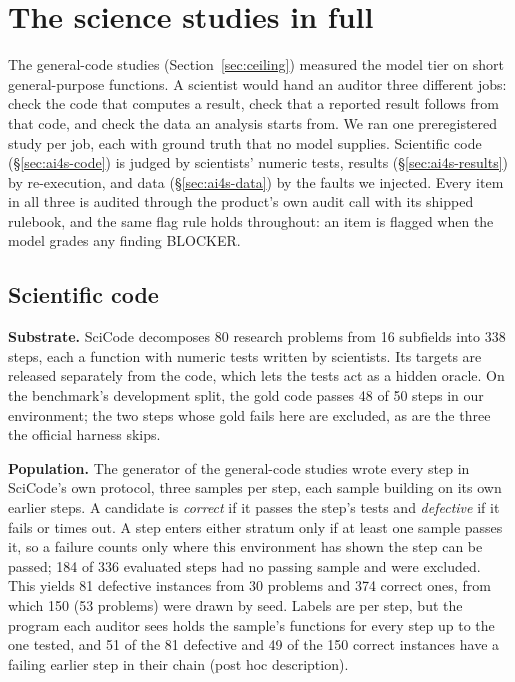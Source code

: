\section{The science studies in full}
\label{sec:ai4s-full}

The general-code studies (Section~\ref{sec:ceiling}) measured the model tier on short general-purpose functions. A scientist would hand
an auditor three different jobs: check the code that computes a result, check that a reported
result follows from that code, and check the data an analysis starts from. We ran one
preregistered study per job, each with ground truth that no model supplies. Scientific code
(\S\ref{sec:ai4s-code}) is judged by scientists' numeric tests, results (\S\ref{sec:ai4s-results})
by re-execution, and data (\S\ref{sec:ai4s-data}) by the faults we injected. Every item in all
three is audited through the product's own audit call with its shipped rulebook, and the same
flag rule holds throughout: an item is flagged when the model grades any finding BLOCKER.

\subsection{Scientific code}
\label{sec:ai4s-code-full}

\textbf{Substrate.} SciCode \citep{tian2024scicode} decomposes 80 research problems from 16
subfields into 338 steps, each a function with numeric tests written by scientists. Its targets
are released separately from the code, which lets the tests act as a hidden oracle. On the
benchmark's development split, the gold code passes 48 of 50 steps in our environment; the two
steps whose gold fails here are excluded, as are the three the official harness skips.

\textbf{Population.} The generator of the general-code studies wrote every step in SciCode's own protocol,
three samples per step, each sample building on its own earlier steps. A candidate is
\emph{correct} if it passes the step's tests and \emph{defective} if it fails or times out. A step
enters either stratum only if at least one sample passes it, so a failure counts only where this
environment has shown the step can be passed; 184 of 336 evaluated steps had no passing sample and were excluded. This yields 81 defective instances from 30 problems and 374 correct ones, from which 150 (53 problems) were drawn by seed. Labels are per step, but the program each auditor sees holds the sample's functions for every step up to the one tested, and 51 of the 81 defective and 49 of the 150 correct instances have a failing earlier step in their chain (post hoc description).

